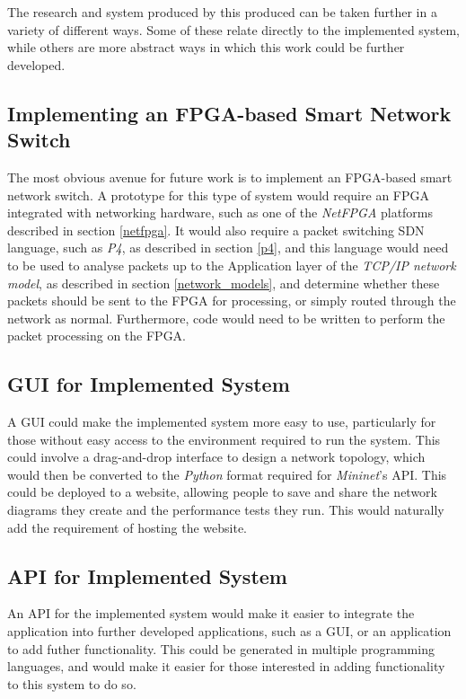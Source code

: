 


%
%
%

The research and system produced by this produced can be taken further in a variety of different ways. Some of these relate directly to the implemented system, while others are more abstract ways in which this work could be further developed.

\subsection{Implementing an FPGA-based Smart Network Switch}
The most obvious avenue for future work is to implement an FPGA-based smart network switch. A prototype for this type of system would require an FPGA integrated with networking hardware, such as one of the \textit{NetFPGA} platforms described in section \ref{netfpga}. It would also require a packet switching SDN language, such as \textit{P4}, as described in section \ref{p4}, and this language would need to be used to analyse packets up to the Application layer of the \textit{TCP/IP network model}, as described in section \ref{network_models}, and determine whether these packets should be sent to the FPGA for processing, or simply routed through the network as normal. Furthermore, code would need to be written to perform the packet processing on the FPGA.

\subsection{GUI for Implemented System}
A GUI could make the implemented system more easy to use, particularly for those without easy access to the environment required to run the system. This could involve a drag-and-drop interface to design a network topology, which would then be converted to the \textit{Python} format required for \textit{Mininet}'s API. This could be deployed to a website, allowing people to save and share the network diagrams they create and the performance tests they run. This would naturally add the requirement of hosting the website.

\subsection{API for Implemented System}
An API for the implemented system would make it easier to integrate the application into further developed applications, such as a GUI, or an application to add futher functionality. This could be generated in multiple programming languages, and would make it easier for those interested in adding functionality to this system to do so.

